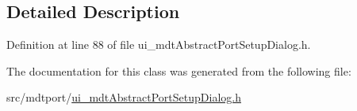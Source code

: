\subsection{Detailed Description}


Definition at line 88 of file ui\-\_\-mdt\-Abstract\-Port\-Setup\-Dialog.\-h.



The documentation for this class was generated from the following file\-:\begin{DoxyCompactItemize}
\item 
src/mdtport/\hyperlink{ui__mdt_abstract_port_setup_dialog_8h}{ui\-\_\-mdt\-Abstract\-Port\-Setup\-Dialog.\-h}\end{DoxyCompactItemize}
